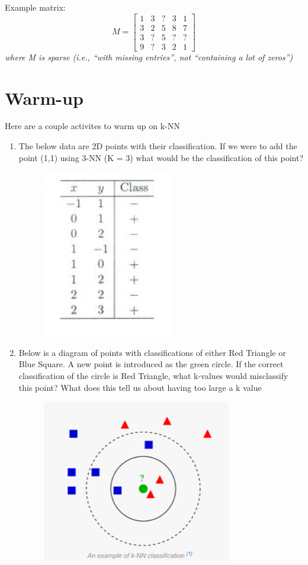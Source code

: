 \documentclass{report}
\begin{document}
Example matrix:
			\[
     			M=
  				\begin{bmatrix}
    					1 & 3 & ? & 3 & 1 \\
    					3 & 2 & 5 & 8 & 7 \\
    					3 & ? & 5 & ? & ? \\
    					9 & ? & 3 & 2 & 1
  				\end{bmatrix}
			\]
\textit{ where M is sparse (i.e., “with missing entries”, not “containing a lot of zeros”)}





\section*{Warm-up}
Here are a couple activites to warm up on k-NN 
\begin{enumerate}
	\item The below data are 2D points with their classification. If we were to add the point (1,1) using 3-NN (K = 3) what would be the classification of this point?
	\begin{figure}[H]
		\centering
		\includegraphics{image/Picture1.png}
	\end{figure}
	\item Below is a diagram of points with classifications of either Red Triangle or Blue Square. A new point is introduced as the green circle. If the correct classification of the circle is Red Triangle, what k-values would misclassify this point? What does this tell us about having too large a k value
	\begin{figure}[H]
		\centering
		\includegraphics{image/Picture2.png}

\end{figure}
\end{enumerate}
\end{document}
